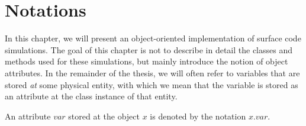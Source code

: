 \chapter{Notations}
In this chapter, we will present an object-oriented implementation of surface code simulations. The goal of this chapter is not to describe in detail the classes and methods used for these simulations, but mainly introduce the notion of object attributes. In the remainder of the thesis, we will often refer to variables that are stored \emph{at} some physical entity, with which we mean that the variable is stored as an attribute at the class instance of that entity. 


\begin{definition}
    An attribute $var$ stored at the object $x$ is denoted by the notation $x.var$. 
\end{definition}